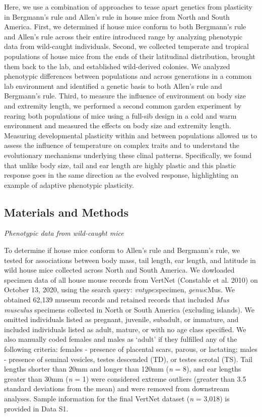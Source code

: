 \documentclass[]{article}
\begin{document}
Here, we use a combination of approaches to tease apart genetics from
plasticity in Bergmann's rule and Allen's rule in house mice from North
and South America. First, we determined if house mice conform to both
Bergmann's rule and Allen's rule across their entire introduced range by
analyzing phenotypic data from wild-caught individuals. Second, we
collected temperate and tropical populations of house mice from the ends
of their latitudinal distribution, brought them back to the lab, and
established wild-derived colonies. We analyzed phenotypic differences
between populations and across generations in a common lab environment
and identified a genetic basis to both Allen's rule and Bergmann's rule.
Third, to measure the influence of environment on body size and
extremity length, we performed a second common garden experiment by
rearing both populations of mice using a full-sib design in a cold and
warm environment and measured the effects on body size and extremity
length. Measuring developmental plasticity within and between
populations allowed us to assess the influence of temperature on complex
traits and to understand the evolutionary mechanisms underlying these
clinal patterns. Specifically, we found that unlike body size, tail and
ear length are highly plastic and this plastic response goes in the same
direction as the evolved response, highlighting an example of adaptive
phenotypic plasticity.

\vspace{5mm}

\hypertarget{materials-and-methods}{%
\subsection{Materials and Methods}\label{materials-and-methods}}

\noindent\emph{Phenotypic data from wild-caught mice}

To determine if house mice conform to Allen's rule and Bergmann's rule,
we tested for associations between body mass, tail length, ear length,
and latitude in wild house mice collected across North and South
America. We dowloaded specimen data of all house mouse records from
VertNet (Constable et al. 2010) on October 13, 2020, using the search
query: \emph{vntype}:specimen, \emph{genus}:Mus. We obtained 62,139
museum records and retained records that included \emph{Mus musculus}
specimens collected in North or South America (excluding islands). We
omitted individuals listed as pregnant, juvenile, subadult, or immature,
and included individuals listed as adult, mature, or with no age class
specified. We also manually coded females and males as `adult' if they
fulfilled any of the following criteria: females - presence of placental
scars, parous, or lactating; males - presence of seminal vesicles,
testes descended (TD), or testes scrotal (TS). Tail lengths shorter than
20mm and longer than 120mm (\emph{n} = 8), and ear lengths greater than
30mm (\emph{n} = 1) were considered extreme outliers (greater than 3.5
standard deviations from the mean) and were removed from downstream
analyses. Sample information for the final VertNet dataset (\emph{n} =
3,018) is provided in Data S1.
\end{document}
